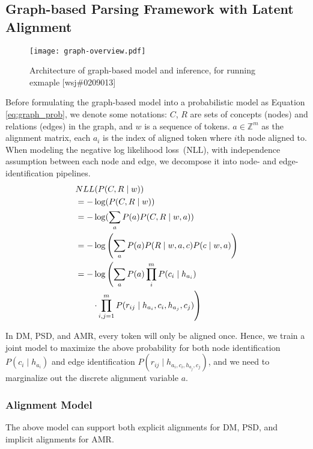 \subsection{Graph-based Parsing Framework with Latent Alignment}
\label{ssec:graph-based}

\begin{figure*}[h]
\centering
\texttt{[image: graph-overview.pdf]}
\caption{\label{fig:graph-based-inference} Architecture of graph-based model and inference, for running exmaple [wsj\#0209013]}
\end{figure*}

Before formulating the graph-based model into a probabilistic model as
Equation \ref{eq:graph_prob}, we denote some notations: $C$, $R$ are
sets of concepts (nodes) and relations (edges) in the graph, and $w$
is a sequence of tokens.  $a \in {\mathbb{Z}}^m$ as the alignment
matrix, each $a_{i}$ is the index of aligned token where $i$th node
aligned to. When modeling the negative log likelihood loss~(NLL), with
independence assumption between each node and edge, we decompose it
into node- and edge-identification pipelines.
\begin{equation}
  \label{eq:graph_prob}
\begin{aligned} \smaller[2]
 & NLL(P(C,R \mid w)) \\
 & = - \log(P(C,R \mid w)) \\
 & = - \log(\sum_{a}{P(a) P(C,R \mid w,a)}) \\
 & = - \log\left(\sum_{a}P(a) P(R\mid w,a,c) P(c \mid w, a)\right) \\
 & = - \log\left(\sum_{a}P(a) \prod_{i}^{m} P(c_{i} \mid h_{a_{i}}) \right. \\
 & \qquad \left.\cdot \prod_{i,j=1}^{m}P(r_{ij} \mid h_{a_{i}}, c_{i}, h_{a_{j}}, c_{j})\right)
\end{aligned}
\end{equation}

In DM, PSD, and AMR, every token will only be aligned once.  Hence, we
train a joint model to maximize the above probability for both node
identification $P(c_{i} \mid h_{a_{i}})$ and edge identification
$P(r_{ij} \mid h_{{a_{i}}, c_{i},h_{a_{j}}, c_{j}})$, and we need to
marginalize out the discrete alignment variable $a$.

\subsubsection{Alignment Model}
The above model can support both explicit alignments for DM, PSD, and implicit alignments for AMR.

